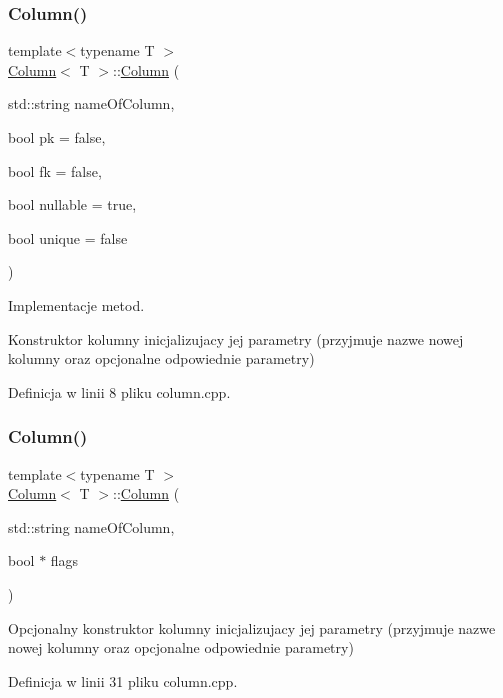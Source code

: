 \subsubsection{\texorpdfstring{Column()}{Column()}\hspace{0.1cm}{\footnotesize\ttfamily [1/2]}}
{\footnotesize\ttfamily template$<$typename T $>$ \\
\mbox{\hyperlink{class_column}{Column}}$<$ T $>$\+::\mbox{\hyperlink{class_column}{Column}} (\begin{DoxyParamCaption}\item[{std\+::string}]{name\+Of\+Column,  }\item[{bool}]{pk = {\ttfamily false},  }\item[{bool}]{fk = {\ttfamily false},  }\item[{bool}]{nullable = {\ttfamily true},  }\item[{bool}]{unique = {\ttfamily false} }\end{DoxyParamCaption})}



Implementacje metod. 

Konstruktor kolumny inicjalizujacy jej parametry (przyjmuje nazwe nowej kolumny oraz opcjonalne odpowiednie parametry) 

Definicja w linii 8 pliku column.\+cpp.

\mbox{\label{class_column_a2563bd8f764ee4423fdb8426e5ff3d2d}} 
\subsubsection{\texorpdfstring{Column()}{Column()}\hspace{0.1cm}{\footnotesize\ttfamily [2/2]}}
{\footnotesize\ttfamily template$<$typename T $>$ \\
\mbox{\hyperlink{class_column}{Column}}$<$ T $>$\+::\mbox{\hyperlink{class_column}{Column}} (\begin{DoxyParamCaption}\item[{std\+::string}]{name\+Of\+Column,  }\item[{bool $\ast$}]{flags }\end{DoxyParamCaption})}

Opcjonalny konstruktor kolumny inicjalizujacy jej parametry (przyjmuje nazwe nowej kolumny oraz opcjonalne odpowiednie parametry) 

Definicja w linii 31 pliku column.\+cpp.



